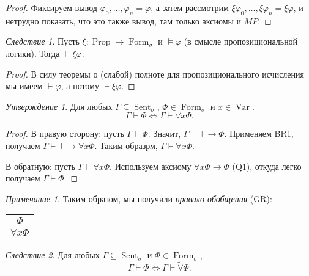 \documentclass[a4paper,100pt]{article}
\theoremstyle{indented}
\theoremstyle{definition}
\theoremstyle{remark}
\newtheorem{remark}{Примечание}
\newtheorem{cons}{Следствие}
\newtheorem{stat}{Утверждение}
\DeclareMathOperator{\ra}{\rightarrow}
\DeclareMathOperator{\Llra}{\Longleftrightarrow}
\DeclareMathOperator{\Prop}{Prop}
\DeclareMathOperator{\form}{Form}
\DeclareMathOperator{\Var}{Var}
\DeclareMathOperator{\Sent}{Sent}
\begin{document}
\begin{proof}
  Фиксируем вывод $\varphi_0, \ldots, \varphi_n = \varphi$, а затем рассмотрим $\xi\varphi_0, \ldots, \xi\varphi_n = \xi\varphi$, и нетрудно показать, что это также вывод, там только аксиомы и $MP$. 
\end{proof}

\begin{cons}
  Пусть $\xi: \Prop \ra \form_\sigma$ и $\vDash \varphi$ (в смысле пропозициональной логики). Тогда $\vdash \xi \varphi$. 
\end{cons}

\begin{proof}
  В силу теоремы о (слабой) полноте для пропозиционального исчисления мы имеем $\vdash \varphi$, а потому $\vdash \xi \varphi$. 
\end{proof}

\begin{stat}
  Для любых $\Gamma \subseteq \Sent_\sigma$, $\Phi \in \form_\sigma$ и $x\in \Var$. 
  \[
    \Gamma \vdash \Phi \Longleftrightarrow \Gamma \vdash \forall x \Phi. 
  \]
\end{stat}

\begin{proof}
  В правую сторону: пусть $\Gamma \vdash \Phi$. Значит, $\Gamma \vdash \top \ra \Phi$. Применяем BR1, получаем $\Gamma \vdash \top \ra \forall x \Phi$. Таким образрм, $\Gamma \vdash \forall x \Phi$. \ 

  В обратную: пусть $\Gamma \vdash \forall x \Phi$. Используем аксиому $\forall x \Phi \ra \Phi$ (Q1), откуда легко получаем $\Gamma \vdash \Phi$. 
\end{proof}

\begin{remark}
  Таким образом, мы получили \textit{правило обобщения} (GR):

  \begin{center}
    \begin{tabular}{c}
      $\Phi$ \\ 
      \hline
      $\forall x \Phi$ 
    \end{tabular}
  \end{center}
\end{remark}

\begin{cons}
  Для любых $\Gamma \subseteq \Sent_\sigma$ и $\Phi \in \form_\sigma$, 
  \[
    \Gamma \vdash \Phi \Llra \Gamma \vdash \tilde{\forall} \Phi.
  \]
\end{cons}
\end{document}
